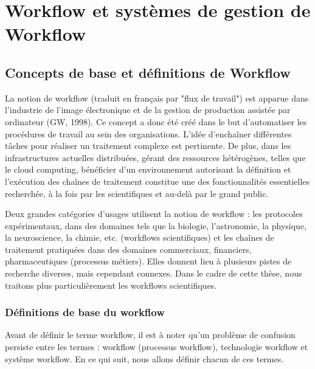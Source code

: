 
 \section{Workflow et systèmes de gestion de Workflow}
 	 
 	 \subsection{ Concepts de base et définitions de Workflow }
 	 
 
La notion de workflow (traduit en français par "flux de travail") est apparue dans l’industrie de l’image électronique et de la gestion de production assistée par ordinateur (GW, 1998). Ce concept a donc été créé dans le but d’automatiser les procédures de travail au sein des organisations. L’idée d’enchaîner différentes tâches pour réaliser un traitement complexe est pertinente. De plus, dans les infrastructures actuelles distribuées, gérant des ressources hétérogènes, telles que le cloud computing, bénéficier d’un environnement autorisant la définition et l’exécution des chaînes de traitement constitue une des fonctionnalités essentielles recherchée, à la fois par les scientifiques et au-delà par le grand public.

Deux grandes catégories d’usages utilisent la notion de workflow : les protocoles expérimentaux, dans des domaines tels que la biologie, l’astronomie, la physique, la neuroscience, la chimie, etc. (workflows scientifiques) et les chaînes de traitement pratiquées dans des domaines commerciaux, financiers, pharmaceutiques (processus métiers). Elles donnent lieu à plusieurs pistes de recherche diverses, mais cependant connexes. Dans le cadre de cette thèse, nous traitons plus particulièrement les workflows scientifiques.

\subsubsection{Définitions  de base du  workflow}


Avant de définir le terme workflow, il est à noter qu'un problème de confusion persiste entre les termes : workflow (processus workflow), technologie workflow et système workflow. En ce qui suit, nous allons définir chacun de ces termes.

